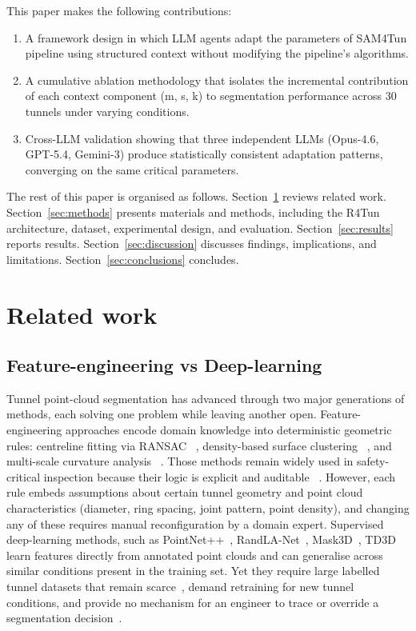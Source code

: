 \documentclass[a4paper,fleqn]{cas-dc}
\begin{document}
This paper makes the following contributions:
\begin{enumerate}
\item A framework design in which LLM agents adapt the parameters of SAM4Tun pipeline using structured context without modifying the pipeline’s algorithms.
\item A cumulative ablation methodology that isolates the incremental contribution of each context component (m, s, k) to segmentation performance across 30 tunnels under varying conditions.
\item Cross-LLM validation showing that three independent LLMs (Opus-4.6, GPT-5.4, Gemini-3) produce statistically consistent adaptation patterns, converging on the same critical parameters.
\end{enumerate}

The rest of this paper is organised as follows. Section~\ref{sec:related} reviews related work. Section~\ref{sec:methods} presents materials and methods, including the R4Tun architecture, dataset, experimental design, and evaluation. Section~\ref{sec:results} reports results. Section~\ref{sec:discussion} discusses findings, implications, and limitations. Section~\ref{sec:conclusions} concludes.

\section{Related work}\label{sec:related}

\subsection{Feature-engineering vs Deep-learning}

Tunnel point-cloud segmentation has advanced through two major generations of methods, each solving one problem while leaving another open. Feature-engineering approaches encode domain knowledge into deterministic geometric rules: centreline fitting via RANSAC ~\cite{fischler1981ransac}, density-based surface clustering ~\cite{ester1996dbscan}, and multi-scale curvature analysis ~\cite{pauly2002}. Those methods remain widely used in safety-critical inspection because their logic is explicit and auditable ~\cite{weidner2024generalized}. However, each rule embeds assumptions about certain tunnel geometry and point cloud characteristics (diameter, ring spacing, joint pattern, point density), and changing any of these requires manual reconfiguration by a domain expert. Supervised deep-learning methods, such as PointNet++~\cite{qi2017pointnet}, RandLA-Net~\cite{hu2020randla}, Mask3D~\cite{schult2023mask3d}, TD3D~\cite{kolodiazhnyi2024td3d} learn features directly from annotated point clouds and can generalise across similar conditions present in the training set. Yet they require large labelled tunnel datasets that remain scarce~\cite{su2024review}, demand retraining for new tunnel conditions, and provide no mechanism for an engineer to trace or override a segmentation decision~\cite{cha2024deep}.
\end{document}
